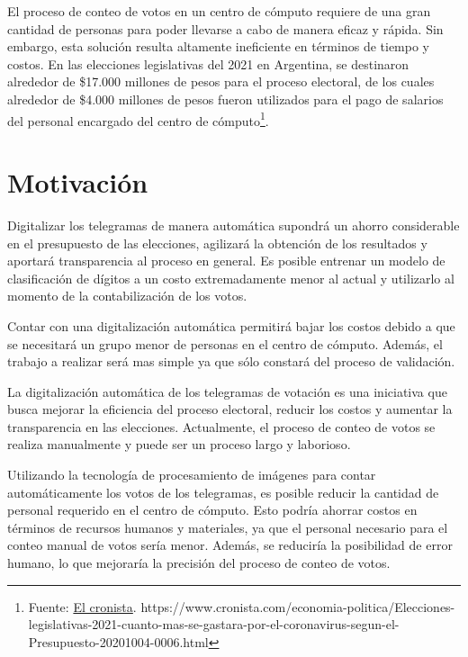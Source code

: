 El proceso de conteo de votos en un centro de cómputo requiere de una gran cantidad de personas para poder llevarse a
cabo de manera eficaz y rápida. Sin embargo, esta solución resulta altamente ineficiente en términos de tiempo y
costos. En las elecciones legislativas del 2021 en Argentina, se destinaron alrededor de \$17.000 millones de pesos
para el proceso electoral, de los cuales alrededor de \$4.000 millones de pesos fueron utilizados para el pago de
salarios del personal encargado del centro de cómputo\footnote{Fuente:
    \href{https://www.cronista.com/economia-politica/Elecciones-legislativas-2021-cuanto-mas-se-gastara-por-el-coronavirus-segun-el-Presupuesto-20201004-0006.html}{El
        cronista}.
    https://www.cronista.com/economia-politica/Elecciones-legislativas-2021-cuanto-mas-se-gastara-por-el-coronavirus-segun-el-Presupuesto-20201004-0006.html}.

\section{Motivación}

Digitalizar los telegramas de manera automática supondrá un ahorro considerable en el presupuesto de las elecciones,
agilizará la obtención de los resultados y aportará transparencia al proceso en general. Es posible entrenar un modelo
de clasificación de dígitos a un costo extremadamente menor al actual y utilizarlo al momento de la contabilización de
los votos.

Contar con una digitalización automática permitirá bajar los costos debido a que se necesitará un grupo menor de
personas en el centro de cómputo. Además, el trabajo a realizar será mas simple ya que sólo constará del proceso de
validación.

La digitalización automática de los telegramas de votación es una iniciativa que busca mejorar la eficiencia del
proceso electoral, reducir los costos y aumentar la transparencia en las elecciones. Actualmente, el proceso de conteo
de votos se realiza manualmente y puede ser un proceso largo y laborioso.

Utilizando la tecnología de procesamiento de imágenes para contar automáticamente los votos de los telegramas, es
posible reducir la cantidad de personal requerido en el centro de cómputo. Esto podría ahorrar costos en términos de
recursos humanos y materiales, ya que el personal necesario para el conteo manual de votos sería menor. Además, se
reduciría la posibilidad de error humano, lo que mejoraría la precisión del proceso de conteo de votos.

